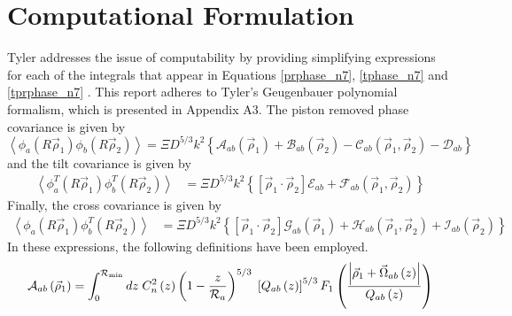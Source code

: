 \section{Computational Formulation}
\label{sec:compcovariance}

Tyler addresses the issue of computability by providing simplifying
expressions for each of the integrals that appear in Equations
\ref{prphase_n7}, \ref{tphase_n7} and \ref{tprphase_n7} .  This report
adheres to Tyler's Geugenbauer polynomial formalism, which is
presented in Appendix A3\cite{1994JOSAA..11..409T}.  The piston
removed phase covariance is given by
\begin{equation}\label{phasecovariance}
\left\langle \phi_{a}\left(R\vec{\rho}_{1}\right)  \phi_{b}\left(R\vec{\rho}_{2}\right)\right\rangle = 
\Xi D^{5/3} k^{2} \left\{
\mathcal{A}_{ab}\left(\vec{\rho}_{1}\right) + 
\mathcal{B}_{ab}\left(\vec{\rho}_{2}\right) - 
\mathcal{C}_{ab}\left(\vec{\rho}_{1},\vec{\rho}_{2}\right) - 
\mathcal{D}_{ab}\right\}
\end{equation}
and the tilt covariance is given by
\begin{equation}\label{tiltcovariance}
\begin{split}
\left\langle \phi^{T}_{a}\left(R\vec{\rho}_{1}\right)  \phi^{T}_{b}\left(R\vec{\rho}_{2}\right)\right\rangle & = 
\Xi D^{5/3} k^{2} \left\{
\left[\vec{\rho}_{1} \cdot \vec{\rho}_{2} \right] \mathcal{E}_{ab} + 
\mathcal{F}_{ab}\left(\vec{\rho}_{1}, \vec{\rho}_{2}\right)
\right\} 
\end{split}
\end{equation}
Finally, the cross covariance is given by
\begin{equation}\label{crosscovariance}
\begin{split}
\left\langle \phi_{a}\left(R\vec{\rho}_{1}\right)  \phi^{T}_{b}\left(R\vec{\rho}_{2}\right)\right\rangle & = 
\Xi D^{5/3} k^{2} \left\{
\left[\vec{\rho}_{1} \cdot \vec{\rho}_{2} \right] \mathcal{G}_{ab}\left(\vec{\rho}_{1}\right) + 
\mathcal{H}_{ab}\left(\vec{\rho}_{1}, \vec{\rho}_{2}\right) + 
\mathcal{I}_{ab}\left(\vec{\rho}_{2}\right)
\right\} 
\end{split}
\end{equation}
In these expressions, the following definitions have been employed.
\begin{equation}\label{caliph_A}
\mathcal{A}_{ab}\left(\vec{\rho}_{1}\right) = 
\int_{0}^{\mathcal{R}_{\rm min}} dz \; C_{n}^{2}\left(z\right) \left( 1 - \frac{z}{\mathcal{R}_{a}}\right)^{5/3}\; 
\left[Q_{ab}\left(z\right)\right]^{5/3} 
F_{1}\left(\frac{\left\vert\vec{\rho}_{1} + \vec{\Omega}_{ab}\left(z\right)\right\vert}{Q_{ab}\left(z\right)}\right)
\end{equation}

